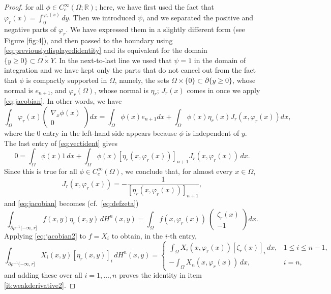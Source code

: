 \documentclass{article}
\newcommand{\R}{\mathbb{R}}
\theoremstyle{definition}
\theoremstyle{remark}
\begin{document}
\begin{proof}
  for all $\phi\in C^\infty_c(\Omega;\R)$; here, we have first used the fact that $\varphi_r(x)=\int_0^{\varphi_r(x)}dy$. Then we introduced $\psi$, and we separated the positive and negative parts of $\varphi_r$. We have expressed them in a slightly different form (see Figure \ref{fig:4}), and then passed to the boundary using \eqref{eq:previouslydisplayedidentity} and its equivalent for the domain $\{y\geq 0\}\subset \overline{\Omega\times Y}$. In the next-to-last line we used that $\psi=1$ in the  domain of integration and we have kept only the parts that do not cancel out from the fact that $\phi$ is compactly supported in $\Omega$, namely, the sets $\Omega\times \{0\}\subset\partial\{y\geq 0\}$, whose normal is $e_{n+1}$,  and  $\varphi_r(\Omega)$, whose normal is $\eta_r$;  $J_r(x)$ comes in %
  once we apply \eqref{eq:jacobian}.
  In other words, we have
  \begin{equation}\label{eq:vectident}
   \int_\Omega\varphi_r(x)\begin{pmatrix}\nabla_x \phi(x)\\0\end{pmatrix}dx
   =\int_\Omega\phi(x)e_{n+1}dx+\int_\Omega\phi(x)\eta_r(x)J_r(x,\varphi_r(x))dx,%
  \end{equation}
  where the 0 entry in the left-hand side appears because $\phi$ is independent of $y$.
  The last entry of \eqref{eq:vectident} gives
  \[0=\int_\Omega\phi(x)1\,dx+\int_\Omega \phi(x)[\eta_r(x,\varphi_r(x))]_{n+1}J_r(x,\varphi_r(x))\,dx.\]
  Since this is true for all $\phi\in C^\infty_c(\Omega)$, we conclude that, for almost every $x\in\Omega$, \[J_r(x,\varphi_r(x))=-\frac1{[\eta_r(x,\varphi_r(x))]_{n+1}},\]
  and \eqref{eq:jacobian} becomes (cf.~\eqref{eq:defzeta})
  \begin{equation}\label{eq:jacobian2}
  \int_{\partial\rho^{-1}(-\infty,r]}f(x,y)\eta_r(x,y)\,dH^n(x,y)=\int_{\Omega}f(x,\varphi_r(x))\
  \begin{pmatrix}
   \zeta_r(x)\\-1
  \end{pmatrix}dx.
  \end{equation}
  Applying \eqref{eq:jacobian2} to $f=X_i$ to obtain, in the $i$-th entry,
  \begin{equation*}%
  \int_{\partial\rho^{-1}(-\infty,r]}X_i(x,y)[\eta_r(x,y)]_i\,dH^n(x,y)=\begin{cases}\int_{\Omega}X_i(x,\varphi_r(x))
   [\zeta_r(x)]_i\,dx,& 1\leq i\leq n-1,\\
   -\int_{\Omega}X_n(x,\varphi_r(x))
   \,dx,&i=n,
   \end{cases}
  \end{equation*}  
  and adding these over all $i=1,\dots, n$ proves the identity in item \ref{it:weakderivative2}.
 

\end{proof}
\end{document}
